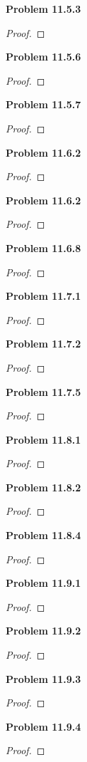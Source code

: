 \documentclass[12pt]{article}
\begin{document}
\textbf{Problem 11.5.3}
\begin{proof}

\end{proof}
\textbf{Problem 11.5.6}
\begin{proof}

\end{proof}
\textbf{Problem 11.5.7}
\begin{proof}

\end{proof}
\textbf{Problem 11.6.2}
\begin{proof}

\end{proof}
\textbf{Problem 11.6.2}
\begin{proof}

\end{proof}
\textbf{Problem 11.6.8}
\begin{proof}

\end{proof}
\textbf{Problem 11.7.1}
\begin{proof}

\end{proof}
\textbf{Problem 11.7.2}
\begin{proof}

\end{proof}
\textbf{Problem 11.7.5}
\begin{proof}

\end{proof}
\textbf{Problem 11.8.1}
\begin{proof}

\end{proof}
\textbf{Problem 11.8.2}
\begin{proof}

\end{proof}
\textbf{Problem 11.8.4}
\begin{proof}

\end{proof}
\textbf{Problem 11.9.1}
\begin{proof}

\end{proof}
\textbf{Problem 11.9.2}
\begin{proof}

\end{proof}
\textbf{Problem 11.9.3}
\begin{proof}

\end{proof}
\textbf{Problem 11.9.4}
\begin{proof}

\end{proof}
\end{document}
